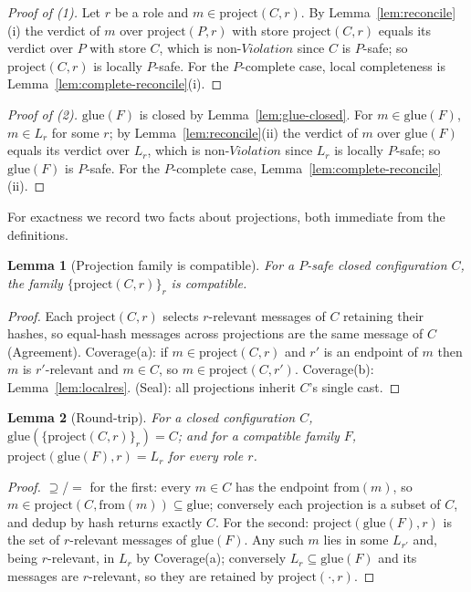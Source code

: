 \documentclass[11pt]{article}
\theoremstyle{definition}
\theoremstyle{plain}
\newtheorem{lemma}{Lemma}
\begin{document}
\begin{proof}[Proof of (1)]
Let $r$ be a role and $m\in\mathrm{project}(C,r)$.
By Lemma~\ref{lem:reconcile}(i) the verdict of $m$ over $\mathrm{project}(P,r)$ with store
$\mathrm{project}(C,r)$ equals its verdict over $P$ with store $C$, which is
non-$\mathit{Violation}$ since $C$ is $P$-safe; so $\mathrm{project}(C,r)$ is locally
$P$-safe.
For the $P$-complete case, local completeness is Lemma~\ref{lem:complete-reconcile}(i).
\end{proof}

\begin{proof}[Proof of (2)]
$\mathrm{glue}(F)$ is closed by Lemma~\ref{lem:glue-closed}.
For $m\in\mathrm{glue}(F)$, $m\in L_r$ for some $r$; by Lemma~\ref{lem:reconcile}(ii) the
verdict of $m$ over $\mathrm{glue}(F)$ equals its verdict over $L_r$, which is
non-$\mathit{Violation}$ since $L_r$ is locally $P$-safe; so $\mathrm{glue}(F)$ is $P$-safe.
For the $P$-complete case, Lemma~\ref{lem:complete-reconcile}(ii).
\end{proof}

For exactness we record two facts about projections, both immediate from the definitions.

\begin{lemma}[Projection family is compatible]
\label{lem:proj-compat}
For a $P$-safe closed configuration $C$, the family $\{\mathrm{project}(C,r)\}_r$ is
compatible.
\end{lemma}
\begin{proof}
Each $\mathrm{project}(C,r)$ selects $r$-relevant messages of $C$ retaining their hashes, so
equal-hash messages across projections are the same message of $C$ (Agreement).
Coverage(a): if $m\in\mathrm{project}(C,r)$ and $r'$ is an endpoint of $m$ then $m$ is
$r'$-relevant and $m\in C$, so $m\in\mathrm{project}(C,r')$.
Coverage(b): Lemma~\ref{lem:localres}.
(Seal): all projections inherit $C$'s single cast.
\end{proof}

\begin{lemma}[Round-trip]
\label{lem:roundtrip}
For a closed configuration $C$, $\mathrm{glue}(\{\mathrm{project}(C,r)\}_r)=C$; and for a
compatible family $F$, $\mathrm{project}(\mathrm{glue}(F),r)=L_r$ for every role $r$.
\end{lemma}
\begin{proof}
$\supseteq$/$=$ for the first: every $m\in C$ has the endpoint $\mathrm{from}(m)$, so
$m\in\mathrm{project}(C,\mathrm{from}(m))\subseteq\mathrm{glue}$; conversely each projection
is a subset of $C$, and dedup by hash returns exactly $C$.
For the second: $\mathrm{project}(\mathrm{glue}(F),r)$ is the set of $r$-relevant messages
of $\mathrm{glue}(F)$.
Any such $m$ lies in some $L_{r'}$ and, being $r$-relevant, in $L_r$ by Coverage(a);
conversely $L_r\subseteq\mathrm{glue}(F)$ and its messages are $r$-relevant, so they are
retained by $\mathrm{project}(\cdot,r)$.
\end{proof}
\end{document}
